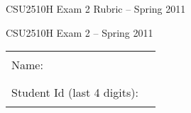 \documentclass[12pt]{article}                   %
\begin{document}
\vspace*{-1.5cm}
\ifrubric
\centerline{\Large CSU2510H Exam 2 Rubric -- Spring 2011}

\else
\centerline{\Large CSU2510H Exam 2 -- Spring 2011}

\vspace{0.5cm}

\begin{center}
\begin{tabular}{l@{\qquad}l}
Name:                        & \rule{174pt}{1pt} \\[.5cm]
Student Id (last 4 digits):  & \rule{174pt}{1pt} \\[.5cm]
\end{tabular}
\end{center}
\end{document}
